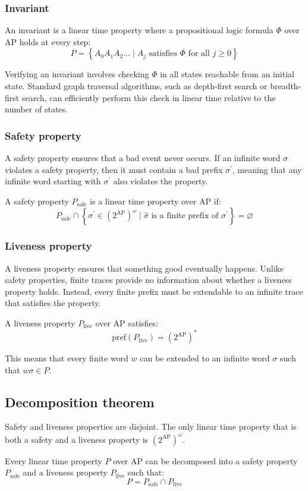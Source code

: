 \subsubsection{Invariant}
\begin{definition}
    An invariant is a linear time property where a propositional logic formula $\Phi$ over $\text{AP}$ holds at every step:
    \[P=\left\{A_0A_1A_2\dots\mid A_j\text{ satisfies }\Phi\text{ for all }j\geq 0\right\}\]
\end{definition}
\noindent Verifying an invariant involves checking $\Phi$ in all states reachable from an initial state.
Standard graph traversal algorithms, such as depth-first search or breadth-first search, can efficiently perform this check in linear time relative to the number of states.

\subsubsection{Safety property}
A safety property ensures that a bad event never occurs. 
If an infinite word $\sigma$ violates a safety property, then it must contain a bad prefix $\sigma^\prime$, meaning that any infinite word starting with $\sigma^\prime$ also violates the property.
\begin{definition}
    A safety property $P_{\text{safe}}$ is a linear time property over $\text{AP}$ if:
    \[P_{\text{safe}}\cap\left\{\sigma^\prime\in\left(2^{\text{AP}}\right)^\omega\mid\hat{\sigma}\text{ is a finite prefix of }\sigma^\prime\right\}=\varnothing\]
\end{definition}

\subsubsection{Liveness property}
A liveness property ensures that something good eventually happens. 
Unlike safety properties, finite traces provide no information about whether a liveness property holds. 
Instead, every finite prefix must be extendable to an infinite trace that satisfies the property.
\begin{definition}
    A liveness property $P_{\text{live}}$ over $\text{AP}$ satisfies: 
    \[\text{pref}(P_{\text{live}})=\left(2^{\text{AP}}\right)^\ast\]
\end{definition}
\noindent This means that every finite word $w$ can be extended to an infinite word $\sigma$ such that $w\sigma\in P$.

\subsection{Decomposition theorem}
Safety and liveness properties are disjoint.
The only linear time property that is both a safety and a liveness property is $\left(2^{\text{AP}}\right)^\omega$. 
\begin{theorem}
    Every linear time property $P$ over $\text{AP}$ can be decomposed into a safety property $P_{\text{safe}}$ and a liveness property $P_{\text{live}}$ such that: 
    \[P=P_{\text{safe}}\cap P_{\text{live}}\]
\end{theorem}